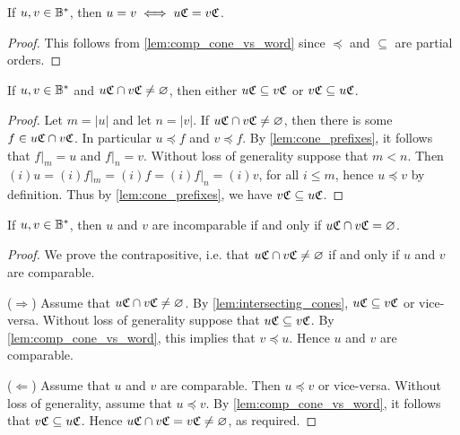 \begin{lemma}\label{lem:words=cones}
    If \(u, v\in \mathbb{B}^*\), then \(u = v \iff u\mathfrak{C} = v\mathfrak{C}\).
\end{lemma}
\begin{proof}
    This follows from \cref{lem:comp_cone_vs_word} since \(\preceq\) and \(\subseteq\) are partial orders.
\end{proof}

\begin{lemma}\label{lem:intersecting_cones}
If \(u, v \in \mathbb{B}^*\) and \(u\mathfrak{C} \cap v\mathfrak{C} \neq \varnothing\), then either
\(u\mathfrak{C} \subseteq v\mathfrak{C}\) or \(v\mathfrak{C} \subseteq u\mathfrak{C}\).
\end{lemma}
\begin{proof}
    Let $m = |u|$ and let $n = |v|$.
    If \(u\mathfrak{C} \cap v\mathfrak{C} \neq \varnothing\), then there is some \(f\in u\mathfrak{C} \cap v\mathfrak{C}\). 
    In particular \(u\preceq f\) and \(v\preceq f\).
    By \cref{lem:cone_prefixes}, it follows that \(f|_{m} = u\) and \(f|_{n} = v\).
    Without loss of generality suppose that $m < n$.
    Then $(i)u = (i)f|_{m} = (i)f = (i)f|_n = (i)v$, for all $i \leq m$,
    hence $u\preceq v$ by definition.
    Thus by \cref{lem:cone_prefixes}, we have \(v\mathfrak{C} \subseteq u\mathfrak{C}\).
\end{proof}

\begin{lemma}\label{lem:incompwords_vs_disjoint_cones}
    If \(u, v\in \mathbb{B}^*\), then \(u\) and \(v\) are incomparable if and only if \(u\mathfrak{C} \cap v\mathfrak{C} = \varnothing\).
\end{lemma}
\begin{proof}
    We prove the contrapositive, i.e. that $u\mathfrak{C} \cap v\mathfrak{C} \neq \varnothing$ if and only if
    $u$ and $v$ are comparable.

    ($\Rightarrow$) Assume that $u\mathfrak{C} \cap v\mathfrak{C} \neq \varnothing$. By \cref{lem:intersecting_cones},
    $u\mathfrak{C} \subseteq v\mathfrak{C}$ or vice-versa. Without loss of generality suppose that
    $u\mathfrak{C} \subseteq v\mathfrak{C}$. By \cref{lem:comp_cone_vs_word}, this implies that $v \preceq u$.
    Hence $u$ and $v$ are comparable.

    ($\Leftarrow$) Assume that $u$ and $v$ are comparable. Then $u \preceq v$ or vice-versa. Without loss
    of generality, assume that $u \preceq v$. By \cref{lem:comp_cone_vs_word}, it follows that $v\mathfrak{C} \subseteq u\mathfrak{C}$.
    Hence $u\mathfrak{C} \cap v\mathfrak{C} = v\mathfrak{C} \neq \varnothing$, as required.
\end{proof}


